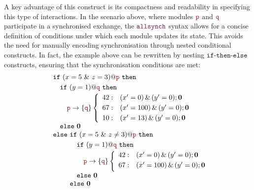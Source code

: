 \begin{itemize}
  
  A key advantage of this construct is its compactness and readability
  in specifying this type of interactions. In the scenario above,
  where modules $\role{p}$ and $\role{q}$ participate in a
  synchronised exchange, the $\allsynchName$ syntax allows for a
  concise definition of conditions under which each module updates its
  state. This avoids the need for manually encoding synchronisation
  through nested conditional constructs.
    In fact, the example above can be
  rewritten by nesting $\mathtt{if\text{-}then\text{-}else}$
  constructs, ensuring that the synchronisation conditions are met:
  \begin{displaymath}
    \begin{array}{ll}
      & \mathtt{if}\ (x=5\ \&\ z=3)@\nr\ \mathtt{then}\\[1mm]
      & \quad \mathtt{if}\ (y=1)@\nrr\ \mathtt{then}\\[1mm]
      & \quad \quad \interactBase{\nr}{\nrr}
        \left\{
        \begin{array}{rlll}
          42 : &  (x'=0)\,\&\,(y'=0);\CEnd \\[1mm]
          67 : &  (x'=100)\,\&\,(y'=0);\CEnd \\[1mm]
          10 : &  (x'=13)\,\&\,(y'=0);\CEnd
        \end{array}
        \right.
      \\
      & \quad \mathtt{else}\ \CEnd \\
      & \mathtt{else}\ \mathtt{if}\ (x=5\ \&\ z\neq3)@\nr\
        \mathtt{then}\\[1mm]
      & \phantom{\mathtt{else}\ }\quad
        \mathtt{if}\ (y=1)@\nrr\ \mathtt{then}\\[1mm]
      & \phantom{\mathtt{else}\ \quad}\quad
        \interactBase{\nr}{\nrr}
        \left\{
        \begin{array}{rlll}
          42 : &  (x'=0)\,\&\,(y'=0);\CEnd \\[1mm]
          67 : &  (x'=100)\,\&\,(y'=0);\CEnd \\[1mm]
        \end{array}
        \right.
      \\
      & \phantom{\mathtt{else}\ }\quad\mathtt{else}\ \CEnd
      \\
      & \phantom{\mathtt{else}\ }\mathtt{else}\ \CEnd
    \end{array}
  \end{displaymath}


\end{itemize}
